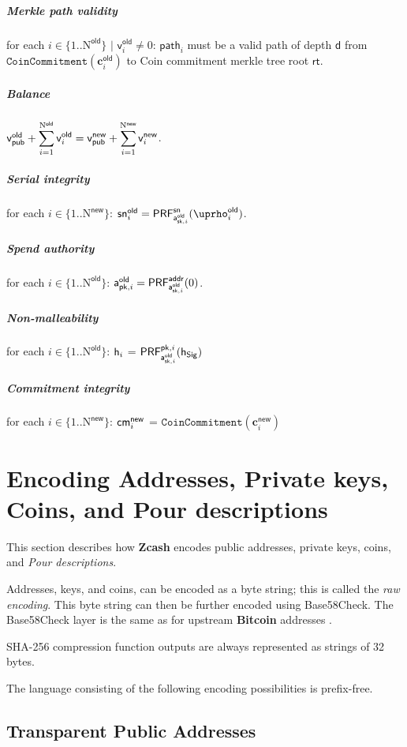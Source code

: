 \documentclass[8pt]{article}
\newcommand{\term}[1]{\textsl{#1}\xspace}
\newcommand{\termbf}[1]{\textbf{#1}\xspace}
\newcommand{\Zcash}{\termbf{Zcash}}
\newcommand{\Bitcoin}{\termbf{Bitcoin}}
\newcommand{\PourDescriptions}{\term{Pour descriptions}}
\newcommand{\SpendAuthorityPublicOld}[1]{\mathsf{a^{old}_{pk,\mathnormal{#1}}}}
\newcommand{\SpendAuthorityPrivateOld}[1]{\mathsf{a^{old}_{sk,\mathnormal{#1}}}}
\newcommand{\CoinAddressRandOld}[1]{\mathsf{\uprho^{old}_\mathnormal{#1}}}
\newcommand{\PRF}[2]{\mathsf{{PRF}^{#2}_\mathnormal{#1}}}
\newcommand{\PRFaddr}[1]{\PRF{#1}{addr}}
\newcommand{\PRFsn}[1]{\PRF{#1}{sn}}
\newcommand{\PRFpk}[2]{\PRF{#1}{pk,{\mathnormal{#2}}}}
\newcommand{\cmNew}[1]{\mathsf{{cm}^{new}_\mathnormal{#1}}}
\newcommand{\MerkleDepth}{\mathsf{d}}
\newcommand{\snOld}[1]{\mathsf{{sn}^{old}_\mathnormal{#1}}}
\newcommand{\vsum}[2]{\smashoperator[r]{\sum_{#1}^{#2}}}
\newcommand{\rt}{\mathsf{rt}}
\newcommand{\hSig}{\mathsf{h_{Sig}}}
\newcommand{\h}[1]{\mathsf{h_{\mathnormal{#1}}}}
\newcommand{\NOld}{\mathrm{N}^\mathsf{old}}
\newcommand{\NNew}{\mathrm{N}^\mathsf{new}}
\newcommand{\vpubOld}{\mathsf{v_{pub}^{old}}}
\newcommand{\vpubNew}{\mathsf{v_{pub}^{new}}}
\newcommand{\cOld}[1]{\mathbf{c}_{#1}^\mathsf{old}}
\newcommand{\cNew}[1]{\mathbf{c}_{#1}^\mathsf{new}}
\newcommand{\vOld}[1]{\mathsf{v}_{#1}^\mathsf{old}}
\newcommand{\vNew}[1]{\mathsf{v}_{#1}^\mathsf{new}}
\newcommand{\treepath}[1]{\mathsf{path}_{#1}}
\newcommand{\CoinCommitment}[1]{\mathtt{CoinCommitment}(#1)}
\begin{document}
\subparagraph{Merkle path validity}

for each $i \in \{1..\NOld\}$ $\mid$ $\vOld{i} \neq 0$: $\treepath{i}$ must be a valid path
of depth $\MerkleDepth$ from \linebreak $\CoinCommitment{\cOld{i}}$ to Coin 
commitment merkle tree root $\rt$.

\subparagraph{Balance}

$\vpubOld + \vsum{i=1}{\NOld} \vOld{i} = \vpubNew + \vsum{i=1}{\NNew} \vNew{i}$.

\subparagraph{Serial integrity}

for each $i \in \{1..\NNew\}$: 
$\snOld{i} = \PRFsn{\SpendAuthorityPrivateOld{i}}(\CoinAddressRandOld{i})$.

\subparagraph{Spend authority}

for each $i \in \{1..\NOld\}$:
$\SpendAuthorityPublicOld{i} = \PRFaddr{\SpendAuthorityPrivateOld{i}}(0)$.

\subparagraph{Non-malleability}

for each $i \in \{1..\NOld\}$: $\h{i}$ = $\PRFpk{\SpendAuthorityPrivateOld{i}}{i}(\hSig)$

\subparagraph{Commitment integrity}

for each $i \in \{1..\NNew\}$: $\cmNew{i}$ = $\CoinCommitment{\cNew{i}}$

\section{Encoding Addresses, Private keys, Coins, and Pour descriptions}

This section describes how \Zcash encodes public addresses, private keys,
coins, and \PourDescriptions.

Addresses, keys, and coins, can be encoded as a byte string; this is called
the \term{raw encoding}. This byte string can then be further encoded using
Base58Check. The Base58Check layer is the same as for upstream \Bitcoin
addresses \cite{Base58Check}.

SHA-256 compression function outputs are always represented as strings of 32
bytes.

The language consisting of the following encoding possibilities is prefix-free.

\subsection{Transparent Public Addresses}
\end{document}
